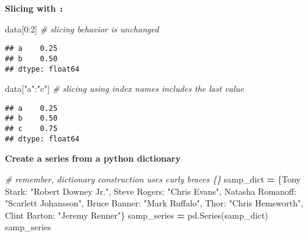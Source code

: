 \documentclass[
]{book}
\newenvironment{Shaded}{\begin{snugshade}}{\end{snugshade}}
\newcommand{\CommentTok}[1]{\textcolor[rgb]{0.56,0.35,0.01}{\textit{#1}}}
\newcommand{\DecValTok}[1]{\textcolor[rgb]{0.00,0.00,0.81}{#1}}
\newcommand{\NormalTok}[1]{#1}
\newcommand{\OperatorTok}[1]{\textcolor[rgb]{0.81,0.36,0.00}{\textbf{#1}}}
\newcommand{\StringTok}[1]{\textcolor[rgb]{0.31,0.60,0.02}{#1}}
\begin{document}
\textbf{Slicing with \texttt{:}}

\begin{Shaded}
\begin{Highlighting}[]
\NormalTok{data[}\DecValTok{0}\NormalTok{:}\DecValTok{2}\NormalTok{] }\CommentTok{\# slicing behavior is unchanged}
\end{Highlighting}
\end{Shaded}

\begin{verbatim}
## a    0.25
## b    0.50
## dtype: float64
\end{verbatim}

\begin{Shaded}
\begin{Highlighting}[]
\NormalTok{data[}\StringTok{"a"}\NormalTok{:}\StringTok{"c"}\NormalTok{] }\CommentTok{\# slicing using index names includes the last value}
\end{Highlighting}
\end{Shaded}

\begin{verbatim}
## a    0.25
## b    0.50
## c    0.75
## dtype: float64
\end{verbatim}

\textbf{Create a series from a python dictionary}

\begin{Shaded}
\begin{Highlighting}[]
\CommentTok{\# remember, dictionary construction uses curly braces \{\}}
\NormalTok{samp\_dict }\OperatorTok{=}\NormalTok{ \{}\StringTok{\textquotesingle{}Tony Stark\textquotesingle{}}\NormalTok{: }\StringTok{"Robert Downey Jr."}\NormalTok{,}
             \StringTok{\textquotesingle{}Steve Rogers\textquotesingle{}}\NormalTok{: }\StringTok{"Chris Evans"}\NormalTok{,}
             \StringTok{\textquotesingle{}Natasha Romanoff\textquotesingle{}}\NormalTok{: }\StringTok{"Scarlett Johansson"}\NormalTok{,}
             \StringTok{\textquotesingle{}Bruce Banner\textquotesingle{}}\NormalTok{: }\StringTok{"Mark Ruffalo"}\NormalTok{,}
             \StringTok{\textquotesingle{}Thor\textquotesingle{}}\NormalTok{: }\StringTok{"Chris Hemsworth"}\NormalTok{,}
             \StringTok{\textquotesingle{}Clint Barton\textquotesingle{}}\NormalTok{: }\StringTok{"Jeremy Renner"}\NormalTok{\}}
\NormalTok{samp\_series }\OperatorTok{=}\NormalTok{ pd.Series(samp\_dict)}
\NormalTok{samp\_series}
\end{Highlighting}
\end{Shaded}
\end{document}
